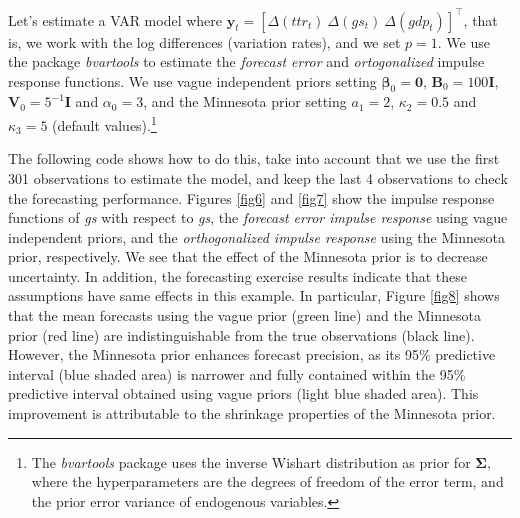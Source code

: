 Let's estimate a VAR model where $\bm{y}_t=[\Delta(ttr_t) \ \Delta(gs_t) \ \Delta(gdp_t)]^{\top}$, that is, we work with the log differences (variation rates), and we set $p=1$. We use the package \textit{bvartools} to estimate the \textit{forecast error} and \textit{ortogonalized} impulse response functions. We use vague independent priors setting $\bm{\beta}_0=\bm{0}$, $\bm{B}_0=100\bm{I}$, $\bm{V}_0=5^{-1}\bm{I}$ and $\alpha_0=3$, and the Minnesota prior setting $a_1=2$, $\kappa_2=0.5$ and $\kappa_3=5$ (default values).\footnote{The \textit{bvartools} package uses the inverse Wishart distribution as prior for $\bm{\Sigma}$, where the hyperparameters are the degrees of freedom of the error term, and the prior error variance of endogenous variables.}

The following code shows how to do this, take into account that we use the first 301 observations to estimate the model, and keep the last 4 observations to check the forecasting performance. Figures \ref{fig6} and \ref{fig7} show the impulse response functions of \textit{gs} with respect to \textit{gs}, the \textit{forecast error impulse response} using vague independent priors, and the \textit{orthogonalized impulse response} using the Minnesota prior, respectively. We see that the effect of the Minnesota prior is to decrease uncertainty. In addition, the forecasting exercise results indicate that these assumptions have same effects in this example. In particular, Figure \ref{fig8} shows that the mean forecasts using the vague prior (green line) and the Minnesota prior (red line) are indistinguishable from the true observations (black line). However, the Minnesota prior enhances forecast precision, as its 95\% predictive interval (blue shaded area) is narrower and fully contained within the 95\% predictive interval obtained using vague priors (light blue shaded area). This improvement is attributable to the shrinkage properties of the Minnesota prior.

